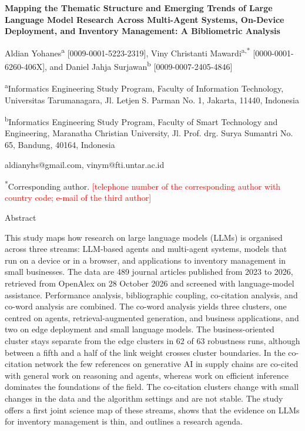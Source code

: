 \documentclass[12pt,a4paper]{article}
\newcommand{\todo}[1]{\textcolor{red}{[#1]}}
\begin{document}
\begin{center}
    \textbf{Mapping the Thematic Structure and Emerging Trends of Large Language Model Research Across Multi-Agent Systems, On-Device Deployment, and Inventory Management: A Bibliometric Analysis}

    Aldian Yohanes\textsuperscript{a} [0009-0001-5223-2319], Viny Christanti Mawardi\textsuperscript{a,*} [0000-0001-6260-406X], and Daniel Jahja Surjawan\textsuperscript{b} [0009-0007-2405-4846]

    \textsuperscript{a}Informatics Engineering Study Program, Faculty of Information Technology, Universitas Tarumanagara, Jl. Letjen S. Parman No. 1, Jakarta, 11440, Indonesia

    \textsuperscript{b}Informatics Engineering Study Program, Faculty of Smart Technology and Engineering, Maranatha Christian University, Jl. Prof. drg. Surya Sumantri No. 65, Bandung, 40164, Indonesia

    aldianyhs@gmail.com, vinym@fti.untar.ac.id

    \textsuperscript{*}Corresponding author. \todo{telephone number of the corresponding author with country code; e-mail of the third author}
\end{center}

\begin{center}
    Abstract
\end{center}

This study maps how research on large language models (LLMs) is organised
across three streams: LLM-based agents and multi-agent systems, models that run
on a device or in a browser, and applications to inventory management in small
businesses. The data are 489 journal articles published from 2023 to 2026,
retrieved from OpenAlex on 28 October 2026 and screened with language-model
assistance. Performance analysis, bibliographic coupling, co-citation analysis,
and co-word analysis are combined. The co-word analysis yields three clusters,
one centred on agents, retrieval-augmented generation, and business
applications, and two on edge deployment and small language models. The
business-oriented cluster stays separate from the edge clusters in 62 of 63
robustness runs, although between a fifth and a half of the link weight crosses
cluster boundaries. In the co-citation network the few references on generative
AI in supply chains are co-cited with general work on reasoning and agents,
whereas work on efficient inference dominates the foundations of the field. The
co-citation clusters change with small changes in the data and the algorithm
settings and are not stable. The
study offers a first joint science map of these streams, shows that the
evidence on LLMs for inventory management is thin, and outlines a research
agenda.
\end{document}
